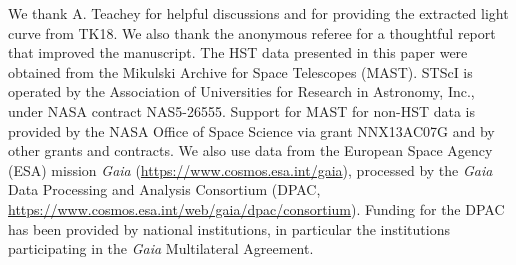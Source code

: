 \documentclass[twocolumn,trackchanges]{aastex62}
\begin{document}
\acknowledgments
We thank A. Teachey for helpful discussions and for providing the extracted light curve from TK18.  We also thank the anonymous referee for a thoughtful report that improved the manuscript. The HST data presented in this paper were obtained from the Mikulski Archive for Space Telescopes (MAST). STScI is operated by the Association of Universities for Research in Astronomy, Inc., under NASA contract NAS5-26555. Support for MAST for non-HST data is provided by the NASA Office of Space Science via grant NNX13AC07G and by other grants and contracts.  We also use data from the European Space Agency (ESA) mission {\it Gaia} (\url{https://www.cosmos.esa.int/gaia}), processed by the {\it Gaia} Data Processing and Analysis Consortium (DPAC, \url{https://www.cosmos.esa.int/web/gaia/dpac/consortium}). Funding for the DPAC has been provided by national institutions, in particular the institutions participating in the {\it Gaia} Multilateral Agreement.  




\end{document}

